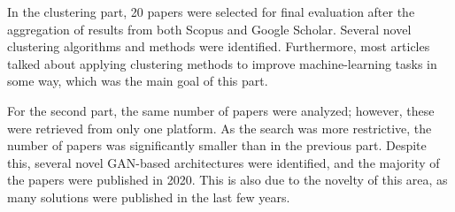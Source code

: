 In the clustering part, 20 papers were selected for final evaluation after the aggregation of results from both Scopus and Google Scholar. Several novel clustering algorithms and methods were identified. Furthermore, most articles talked about applying clustering methods to improve machine-learning tasks in some way, which was the main goal of this part.

For the second part, the same number of papers were analyzed; however, these were retrieved from only one platform. As the search was more restrictive, the number of papers was significantly smaller than in the previous part. Despite this, several novel GAN-based architectures were identified, and the majority of the papers were published in 2020. This is also due to the novelty of this area, as many solutions were published in the last few years.


